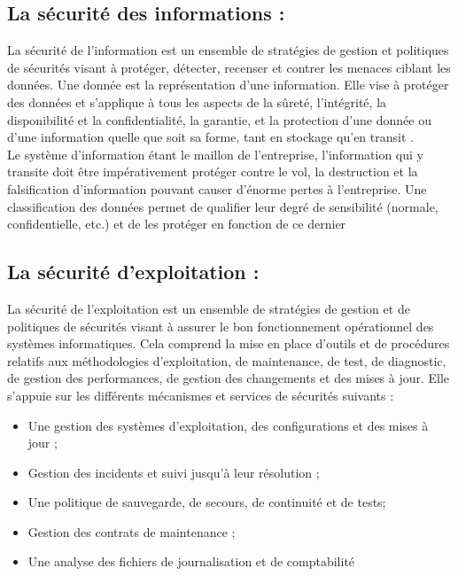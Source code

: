 \subsection{La sécurité des informations : }
La sécurité de l'information est un ensemble de stratégies de gestion et politiques de sécurités visant à protéger, détecter, recenser et contrer les menaces ciblant les données. Une donnée est la représentation d’une information. Elle vise à protéger des données et s'applique à tous les aspects de la sûreté, l'intégrité, la disponibilité et la confidentialité, la garantie, et la protection d'une donnée ou d'une information quelle que soit sa forme, tant en stockage qu'en transit \cite{ref8}.\\

Le système d’information étant le maillon de l’entreprise, l’information qui y transite doit être impérativement protéger contre le vol, la destruction et la falsification d’information pouvant causer d'énorme pertes à l’entreprise. Une classification des données permet de qualifier leur degré de sensibilité (normale, confidentielle, etc.) et de les protéger en fonction de ce dernier
\subsection{La sécurité d'exploitation : }
La sécurité de l'exploitation est un ensemble de stratégies de gestion et de politiques de sécurités visant à assurer le bon fonctionnement opérationnel des systèmes informatiques. Cela comprend la mise en place d'outils et de procédures relatifs aux méthodologies d'exploitation, de maintenance, de test, de diagnostic, de gestion des performances, de gestion des changements et des mises à jour\cite{ref4}. Elle s'appuie sur les différents mécanismes et services de sécurités suivants :
\begin{itemize}[label=\textbullet]
\item Une gestion des systèmes d’exploitation, des configurations et des mises à jour ;
\item Gestion des incidents et suivi jusqu’à leur résolution ;
\item Une politique de sauvegarde, de secours, de continuité et de tests;
\item Gestion des contrats de maintenance ;
\item Une analyse des fichiers de journalisation et de comptabilité 
\end{itemize}
